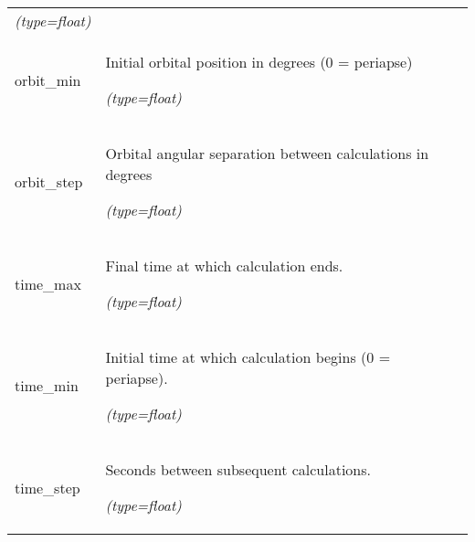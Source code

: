 \begin{longtable}{|p{\varnamewidth}|p{\vardescrwidth}|l}
            {\it (type=float)}&\\
\cline{1-2}
\raggedright o\-r\-b\-i\-t\-\_\-m\-i\-n\- & \raggedright Initial orbital position in degrees (0 = periapse)

            {\it (type=float)}&\\
\cline{1-2}
\raggedright o\-r\-b\-i\-t\-\_\-s\-t\-e\-p\- & \raggedright Orbital angular separation between calculations in degrees

            {\it (type=float)}&\\
\cline{1-2}
\raggedright t\-i\-m\-e\-\_\-m\-a\-x\- & \raggedright Final time at which calculation ends.

            {\it (type=float)}&\\
\cline{1-2}
\raggedright t\-i\-m\-e\-\_\-m\-i\-n\- & \raggedright Initial time at which calculation begins (0 = periapse).

            {\it (type=float)}&\\
\cline{1-2}
\raggedright t\-i\-m\-e\-\_\-s\-t\-e\-p\- & \raggedright Seconds between subsequent calculations.

            {\it (type=float)}&\\
\cline{1-2}
\end{longtable}

